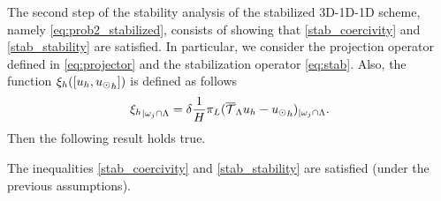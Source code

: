 The second step of the stability analysis of the stabilized 3D-1D-1D scheme, namely  \eqref{eq:prob2_stabilized}, consists of showing that \eqref{stab_coercivity} and \eqref{stab_stability} are satisfied. In particular, we consider the projection operator defined in \eqref{eq:projector} and the stabilization operator \eqref{eq:stab}. Also, the function $\xi_h([u_h, {u_{\odot}}_h])$ is defined as follows
\begin{equation*}
{\xi_h}_{|\omega _j\cap \Lambda}=\delta \frac 1H \pi_L({\overline{\mathcal{T}}_\Lambda} u_h-{u_{\odot}}_h)_{|\omega _j \cap \Lambda}.
\end{equation*}
Then the following result holds true. 
\begin{lemma}
The inequalities \eqref{stab_coercivity} and \eqref{stab_stability} are satisfied (under the previous assumptions).
\end{lemma}
